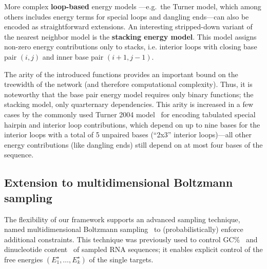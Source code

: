 \documentclass{bioinfo}
\newcommand{\val}{\bar S} %
\newcommand{\Ehp}[1]{E^{\textrm{hp}}(#1)}
\newcommand{\Def}[1]{{\bfseries #1}}
\newcommand{\TargetE}{E^{\star}}
\newcommand{\Nuc}[1]{{\sf #1}}
\newcommand{\Cb}{\Nuc{C}}
\newcommand{\Gb}{\Nuc{G}}
\newcommand{\GCb}{\Gb\Cb}
\newcommand{\evalfor}[2]{#1\llbracket{}#2\rrbracket{}}
\begin{document}

More complex \Def{loop-based}
 energy models ---e.g.~the Turner model,
which among others includes energy terms for special loops and dangling
ends---can also be encoded as straightforward extensions. An interesting
stripped-down variant of the nearest neighbor model is the
\Def{stacking energy model}. This model assigns non-zero energy
contributions only to stacks, i.e. interior loops with closing base
pair $(i,j)$ and inner base pair $(i+1,j-1)$.

The arity of the introduced functions provides an important bound on the
treewidth of the network (and therefore computational
complexity). Thus, it is noteworthy that the base pair energy model
requires only binary functions; the stacking model, only quarternary
dependencies. This arity is increased in a few cases by the commonly
used Turner 2004 model~\citep{Turner2009} for encoding tabulated
special hairpin and interior loop contributions, which depend on up to
nine bases for the interior loops with a total of 5 unpaired bases
(``2x3'' interior loops)---all other energy contributions (like
dangling ends) still depend on at most four bases of the sequence.

\subsection{Extension to multidimensional Boltzmann sampling}\label{sec:multiBoltzmann}
The flexibility of our framework supports an advanced sampling technique, named multidimensional Boltzmann sampling~\citep{Bodini2010} to (probabilistically) enforce additional constraints.
This technique was previously used to control \GCb\%~\citep{Waldispuehl2011,Reinharz2013} and dinucleotide content~\citep{Zhang2013} of sampled RNA sequences; it enables explicit control of the free energies $(\TargetE_1,\ldots,\TargetE_k)$ of the single targets. %
\end{document}
